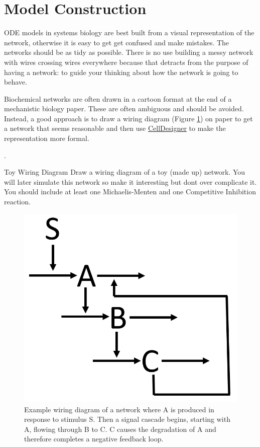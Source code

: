 \documentclass[../../main]{subfiles}
\begin{document}
    \section{Model Construction}
    ODE models in systems biology are best built from a visual representation of the network, otherwise it
    is easy to get get confused and make mistakes. The networks should be as tidy as possible. There is no use
    building a messy network with wires crossing wires everywhere because that detracts from the
    purpose of having a network: to guide your thinking about how the network is going to behave.

    Biochemical networks are often drawn in a cartoon format at the end of a mechanistic biology paper. These are often
    ambiguous and should be avoided. Instead, a good approach is to draw a wiring diagram (Figure \ref{fig:model_construction:wiring_diagram})
    on paper to get a network that seems reasonable and then use \href{http://www.celldesigner.org/}{CellDesigner} to make the representation
    more formal.

    .


    \begin{Task}[label=ToyWiringDiagram]{Toy Wiring Diagram}
        Draw a wiring diagram of a toy (made up) network. You will later simulate this network so make it interesting
        but dont over complicate it. You should include at least one Michaelis-Menten and one Competitive Inhibition
        reaction.
    \end{Task}

    \begin{figure}[t]
        \centering
        \includegraphics[width=0.5\linewidth]{ODEModels/ModelConstruction/assets/wiring_diagram.png}
        \caption[wiring diagram]{Example wiring diagram of a network where A is produced in response to stimulus S.
        Then a signal cascade begins, starting with A, flowing through B to C. C causes the degradation of A and
        therefore completes a negative feedback loop.}
        \label{fig:model_construction:wiring_diagram}
    \end{figure}
\end{document}
